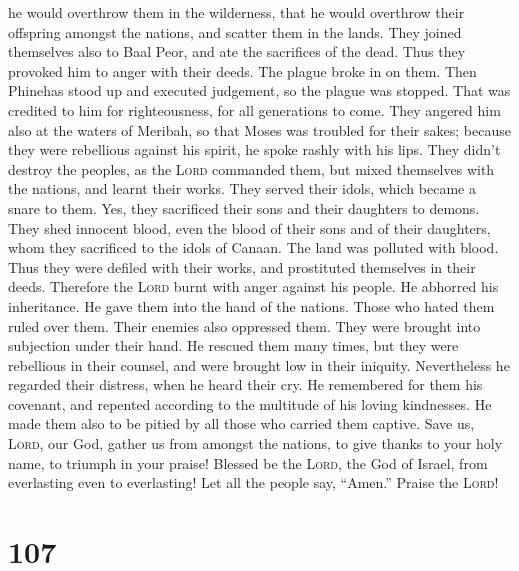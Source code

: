 he would overthrow them in the wilderness,  that he would
overthrow their offspring amongst the nations, and scatter them in the
lands.  They joined themselves also to Baal Peor, and ate
the sacrifices of the dead.  Thus they provoked him to
anger with their deeds. The plague broke in on them. 
Then Phinehas stood up and executed judgement, so the plague was
stopped.  That was credited to him for righteousness, for
all generations to come.  They angered him also at the
waters of Meribah, so that Moses was troubled for their sakes;
 because they were rebellious against his spirit, he
spoke rashly with his lips.  They didn't destroy the
peoples, as the \textsc{Lord} commanded them,  but mixed
themselves with the nations, and learnt their works. 
They served their idols, which became a snare to them. 
Yes, they sacrificed their sons and their daughters to demons.
 They shed innocent blood, even the blood of their sons
and of their daughters, whom they sacrificed to the idols of Canaan. The
land was polluted with blood.  Thus they were defiled
with their works, and prostituted themselves in their deeds.
 Therefore the \textsc{Lord} burnt with anger against his
people. He abhorred his inheritance.  He gave them into
the hand of the nations. Those who hated them ruled over them.
 Their enemies also oppressed them. They were brought
into subjection under their hand.  He rescued them many
times, but they were rebellious in their counsel, and were brought low
in their iniquity.  Nevertheless he regarded their
distress, when he heard their cry.  He remembered for
them his covenant, and repented according to the multitude of his loving
kindnesses.  He made them also to be pitied by all those
who carried them captive.  Save us, \textsc{Lord}, our
God, gather us from amongst the nations, to give thanks to your holy
name, to triumph in your praise!  Blessed be the
\textsc{Lord}, the God of Israel, from everlasting even to everlasting!
Let all the people say, ``Amen.'' Praise the \textsc{Lord}!

\hypertarget{section-106}{%
\section{107}\label{section-106}}

